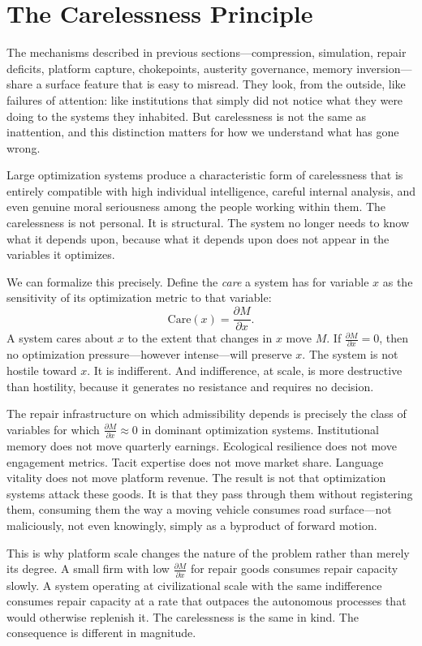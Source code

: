 \documentclass[11pt, letterpaper]{article}
\begin{document}
\section{The Carelessness Principle}

The mechanisms described in previous sections---compression, simulation, repair deficits, platform capture, chokepoints, austerity governance, memory inversion---share a surface feature that is easy to misread. They look, from the outside, like failures of attention: like institutions that simply did not notice what they were doing to the systems they inhabited. But carelessness is not the same as inattention, and this distinction matters for how we understand what has gone wrong.

Large optimization systems produce a characteristic form of carelessness that is entirely compatible with high individual intelligence, careful internal analysis, and even genuine moral seriousness among the people working within them. The carelessness is not personal. It is structural. The system no longer needs to know what it depends upon, because what it depends upon does not appear in the variables it optimizes.

We can formalize this precisely. Define the \emph{care} a system has for variable $x$ as the sensitivity of its optimization metric to that variable:
\[
  \text{Care}(x) = \frac{\partial M}{\partial x}.
\]
A system cares about $x$ to the extent that changes in $x$ move $M$. If $\frac{\partial M}{\partial x} = 0$, then no optimization pressure---however intense---will preserve $x$. The system is not hostile toward $x$. It is indifferent. And indifference, at scale, is more destructive than hostility, because it generates no resistance and requires no decision.

The repair infrastructure on which admissibility depends is precisely the class of variables for which $\frac{\partial M}{\partial x} \approx 0$ in dominant optimization systems. Institutional memory does not move quarterly earnings. Ecological resilience does not move engagement metrics. Tacit expertise does not move market share. Language vitality does not move platform revenue. The result is not that optimization systems attack these goods. It is that they pass through them without registering them, consuming them the way a moving vehicle consumes road surface---not maliciously, not even knowingly, simply as a byproduct of forward motion.

This is why platform scale changes the nature of the problem rather than merely its degree. A small firm with low $\frac{\partial M}{\partial x}$ for repair goods consumes repair capacity slowly. A system operating at civilizational scale with the same indifference consumes repair capacity at a rate that outpaces the autonomous processes that would otherwise replenish it. The carelessness is the same in kind. The consequence is different in magnitude.
\end{document}
